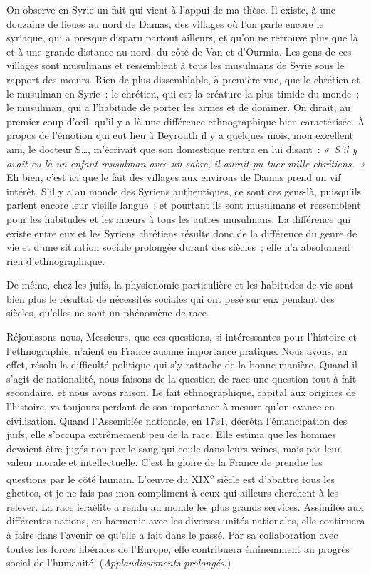 \documentclass[french,twoside]{book} %
\newcommand\orgName[1]{#1}
\newcommand\placeName[1]{#1}
\begin{document}
On observe en {\placeName Syrie} un fait qui vient à l’appui de ma thèse. Il existe, à une douzaine de lieues au nord de {\placeName Damas}, des villages où l’on parle encore le syriaque, qui a presque disparu partout ailleurs, et qu’on ne retrouve plus que là et à une grande distance au nord, du côté de {\placeName Van} et d’{\placeName Ourmia}. Les gens de ces villages sont musulmans et ressemblent à tous les musulmans de {\placeName Syrie} sous le rapport des mœurs. Rien de plus dissemblable, à première vue, que le chrétien et le musulman en {\placeName Syrie} : le chrétien, qui est la créature la plus timide du monde ; le musulman, qui a l’habitude de porter les armes et de dominer. On dirait, au premier coup d’œil, qu’il y a là une différence ethnographique bien caractérisée. À propos de l’émotion qui eut lieu à {\placeName Beyrouth} il y a quelques mois, mon excellent ami, le docteur S…, m’écrivait que son domestique rentra en lui disant : \emph{« S’il y avait eu là un enfant musulman avec un sabre, il aurait pu tuer mille chrétiens. »} Eh bien, c’est ici que le fait des villages aux environs de {\placeName Damas} prend un vif intérêt. S’il y a au monde des Syriens authentiques, ce sont ces gens-là, puisqu’ils parlent encore leur vieille langue ; et pourtant ils sont musulmans et ressemblent pour les habitudes et les mœurs à tous les autres musulmans. La différence qui existe entre eux et les {\orgName Syriens chrétiens} résulte donc de la différence du genre de vie et d’une situation sociale prolongée durant des siècles ; elle n’a absolument rien d’ethnographique.\par
De même, chez les {\orgName juifs}, la physionomie particulière et les habitudes de vie sont bien plus le résultat de nécessités sociales qui ont pesé sur eux pendant des siècles, qu’elles ne sont un phénomène de race.\par
Réjouissons-nous, Messieurs, que ces questions, si intéressantes pour l’histoire et l’ethnographie, n’aient en {\placeName France} aucune importance pratique. Nous avons, en effet, résolu la difficulté politique qui s’y rattache de la bonne manière. Quand il s’agit de nationalité, nous faisons de la question de race une question tout à fait secondaire, et nous avons raison. Le fait ethnographique, capital aux origines de l’histoire, va toujours perdant de son importance à mesure qu’on avance en civilisation. Quand l’{\orgName Assemblée nationale}, en 1791, décréta l’émancipation des {\orgName juifs}, elle s’occupa extrêmement peu de la race. Elle estima que les hommes devaient être jugés non par le sang qui coule dans leurs veines, mais par leur valeur morale et intellectuelle. C’est la gloire de la France de prendre les questions par le côté humain. L’œuvre du XIX\textsuperscript{e} siècle est d’abattre tous les ghettos, et je ne fais pas mon compliment à ceux qui ailleurs cherchent à les relever. La race israélite a rendu au monde les plus grands services. Assimilée aux différentes nations, en harmonie avec les diverses unités nationales, elle continuera à faire dans l’avenir ce qu’elle a fait dans le passé. Par sa collaboration avec toutes les forces libérales de l’{\placeName Europe}, elle contribuera éminemment au progrès social de l’humanité. ({\itshape Applaudissements prolongés}.)
\end{document}
